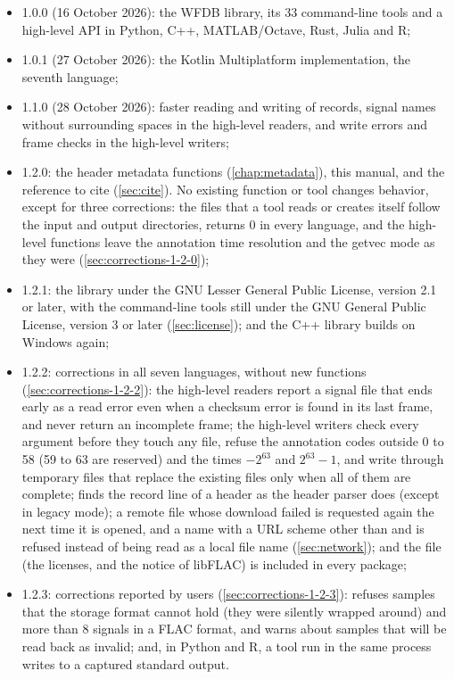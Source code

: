 \begin{itemize}
\item 1.0.0 (16 October 2026): the WFDB library, its 33 command-line tools
  and a high-level API in Python, C++, MATLAB/Octave, Rust, Julia and R;
\item 1.0.1 (27 October 2026): the Kotlin Multiplatform implementation, the
  seventh language;
\item 1.1.0 (28 October 2026): faster reading and writing of records, signal
  names without surrounding spaces in the high-level readers, and write
  errors and frame checks in the high-level writers;
\item 1.2.0: the header metadata functions (\cref{chap:metadata}), this
  manual, and the reference to cite (\cref{sec:cite}). No existing function
  or tool changes behavior, except for three corrections: the files that a
  tool reads or creates itself follow the input and output directories,
   returns 0 in every language, and the
  high-level functions leave the annotation time resolution and the getvec
  mode as they were (\cref{sec:corrections-1-2-0});
\item 1.2.1: the library under the GNU Lesser General Public License,
  version 2.1 or later, with the command-line tools still under the GNU
  General Public License, version 3 or later (\cref{sec:license}); and the
  C++ library builds on Windows again;
\item 1.2.2: corrections in all seven languages, without new functions
  (\cref{sec:corrections-1-2-2}): the high-level readers report a signal
  file that ends early as a read error even when a checksum error is found
  in its last frame, and never return an incomplete frame; the high-level
  writers check every argument before they touch any file, refuse the
  annotation codes outside 0 to 58 (59 to 63 are reserved) and the times
  $-2^{63}$ and $2^{63}-1$, and write through temporary files that replace
  the existing files only when all of them are complete; 
  finds the record line of a header as the header parser does (except in
  legacy mode); a remote file whose download failed is requested again the
  next time it is opened, and a name with a URL scheme other than
   and  is refused instead of being read as a
  local file name (\cref{sec:network}); and the file  (the
  licenses, and the notice of libFLAC) is included in every package;
\item 1.2.3: corrections reported by users (\cref{sec:corrections-1-2-3}):
   refuses samples that the storage format cannot hold
  (they were silently wrapped around) and more than 8 signals in a FLAC
  format, and warns about samples that will be read back as invalid; and, in
  Python and R, a tool run in the same process writes to a captured
  standard output.
\end{itemize}

